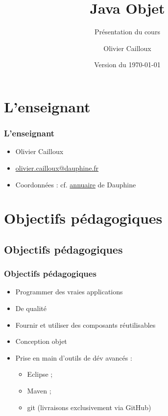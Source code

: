 \documentclass[english, french]{beamer}
\title{Java Objet}
\subtitle{Présentation du cours}
\author{Olivier Cailloux}
\institute[LAMSADE]{LAMSADE, Université Paris-Dauphine}
\date{Version du \today}
\begin{document}


\begin{frame}[plain]
   \titlepage
\end{frame}
\addtocounter{framenumber}{-1}

\section{L’enseignant}
\begin{frame}
	\frametitle{L’enseignant}
	\begin{itemize}
		\item Olivier Cailloux
		\item \href{mailto:olivier.cailloux@dauphine.fr}{olivier.cailloux@dauphine.fr}
		\item Coordonnées : cf. \href{https://www.ent.dauphine.fr/annuaire/index.php?param0=fiche&param1=ocailloux}{annuaire} de Dauphine
	\end{itemize}
\end{frame}

\section[Obj. pédagogiques]{Objectifs pédagogiques}
\subsection{Objectifs pédagogiques}
\begin{frame}
	\frametitle{Objectifs pédagogiques}
	\begin{itemize}
		\item Programmer des vraies applications
		\item De qualité
		\item Fournir et utiliser des composants réutilisables
		\item Conception objet
		\item Prise en main d’outils de dév avancés : 
		\begin{itemize}
			\item Eclipse ;
			\item Maven ;
			\item git (livraisons exclusivement via GitHub)
		\end{itemize}
	\end{itemize}
\end{frame}
\end{document}
